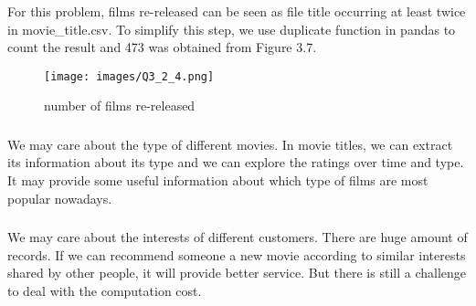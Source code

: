 \documentclass[paper=a4, fontsize=11pt]{scrartcl} %
\begin{document}
\subsubsection{}
For this problem, films re-released can be seen as file title occurring at least twice in movie\_title.csv. To simplify this step, we use duplicate function in pandas to count the result and 473 was obtained from Figure 3.7.
\begin{figure}[htbp]
\centering
\texttt{[image: images/Q3\_2\_4.png]}
\caption{number of films re-released}
\label{fig:data-files}
\end{figure}

\subsubsection{}
We may care about the type of different movies. In movie titles, we can extract its information about its type and we can explore the ratings over time and type. It may provide some useful information about which type of films are most popular nowadays.

\subsubsection{}
We may care about the interests of different customers. There are huge amount of records. If we can recommend someone a new movie according to similar interests shared by other people, it will provide better service. But there is still a challenge to deal with the computation cost.
\end{document}
